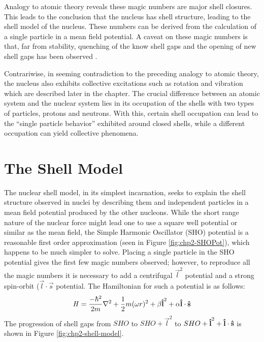 Analogy to atomic theory reveals these magic numbers are major shell closures. This leads to the conclusion that the nucleus has shell structure, leading to the shell model of the nucleus. These numbers can be derived from the calculation of a single particle in a mean field potential. A caveat on these magic numbers is that, far from stability, quenching of the know shell gaps and the opening of new shell gaps has been observed \cite{changingShells}.

Contrariwise, in seeming contradiction to the preceding analogy to atomic theory, the nucleus also exhibits collective excitations such as rotation and vibration which are described later in the chapter. The crucial difference between an atomic system and the nuclear system lies in its occupation of the shells with two types of particles, protons and neutrons. With this, certain shell occupation can lead to the ``single particle behavior'' exhibited around closed shells, while a different occupation can yield collective phenomena.

\section{The Shell Model}
\label{sec:models-shell-model}
The nuclear shell model, in its simplest incarnation, seeks to explain the shell structure observed in nuclei by describing them and independent particles in a mean field potential produced by the other nucleons. While the short range nature of the nuclear force might lead one to use a square well potential or similar as the mean field, the Simple Harmonic Oscillator (SHO) potential is a reasonable first order approximation (seen in Figure \ref{fig:chp2-SHOPot}), which happens to be much simpler to solve. Placing a single particle in the SHO potential gives the first few magic numbers observed; however, to reproduce all the magic numbers it is necessary to add a centrifugal $\vec{l}^2$ potential and a strong spin-orbit ($\vec{l}\cdot\vec{s}$ potential. The Hamiltonian for such a potential is as follows:
\begin{equation}
\label{eqn:chp2-sm-sho-hamil}
\mathbf{\mathit{H}} = \frac{-\hbar^2}{2m}\nabla^2 + \frac{1}{2}m(\omega r)^2 + \beta \boldsymbol{\hat{\textbf{l}}}^2 + \alpha \boldsymbol{\hat{\textbf{l}}}\cdot{}\boldsymbol{\hat{\textbf{s}}}
\end{equation}
The progression of shell gaps from $SHO$ to $SHO + \vec{l}^2$ to $SHO + \boldsymbol{\hat{\textbf{l}}}^2 + \boldsymbol{\hat{\textbf{l}}}\cdot\boldsymbol{\hat{\textbf{s}}}$ is shown in Figure \ref{fig:chp2-shell-model}.

